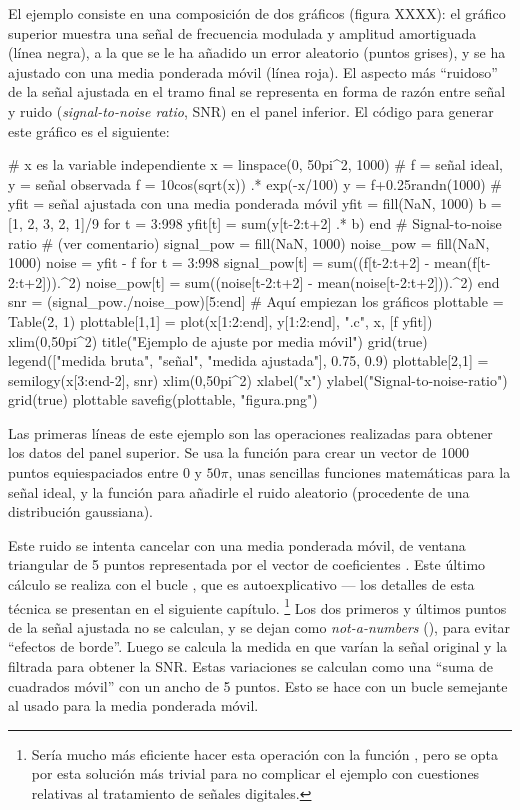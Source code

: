 El ejemplo consiste en una composición de dos gráficos (figura XXXX): el gráfico superior muestra una señal de frecuencia modulada y amplitud amortiguada (línea negra), a la que se le ha añadido un error aleatorio (puntos grises), y se ha ajustado con una media ponderada móvil (línea roja). El aspecto más ``ruidoso'' de la señal ajustada en el tramo final se representa en forma de razón entre señal y ruido (\emph{signal-to-noise ratio}, SNR) en el panel inferior. El código para generar este gráfico es el siguiente:

\begin{juliacode}
# x es la variable independiente
x = linspace(0, 50pi^2, 1000)
# f = señal ideal, y = señal observada
f = 10cos(sqrt(x)) .* exp(-x/100)
y = f+0.25randn(1000)
# yfit = señal ajustada con una media ponderada móvil
yfit = fill(NaN, 1000)
b = [1, 2, 3, 2, 1]/9
for t = 3:998
  yfit[t] = sum(y[t-2:t+2] .* b)
end
# Signal-to-noise ratio
# (ver comentario)
signal_pow = fill(NaN, 1000)
noise_pow = fill(NaN, 1000)
noise = yfit - f
for t = 3:998
  signal_pow[t] = sum((f[t-2:t+2] - mean(f[t-2:t+2])).^2)
  noise_pow[t] = sum((noise[t-2:t+2] - mean(noise[t-2:t+2])).^2)
end
snr = (signal_pow./noise_pow)[5:end]
# Aquí empiezan los gráficos
plottable = Table(2, 1)
plottable[1,1] = plot(x[1:2:end], y[1:2:end], ".c", x, [f yfit])
xlim(0,50pi^2)
title("Ejemplo de ajuste por media móvil")
grid(true)
legend(["medida bruta", "señal", "medida ajustada"], 0.75, 0.9)
plottable[2,1] = semilogy(x[3:end-2], snr)
xlim(0,50pi^2)
xlabel("x")
ylabel("Signal-to-noise-ratio")
grid(true)
plottable
savefig(plottable, "figura.png")
\end{juliacode}

Las primeras líneas de este ejemplo son las operaciones realizadas para obtener los datos del panel superior. Se usa la función  para crear un vector de 1000 puntos equiespaciados entre $0$ y $50\pi$, unas sencillas funciones matemáticas para la señal ideal, y la función  para añadirle el ruido aleatorio (procedente de una distribución gaussiana).

Este ruido se intenta cancelar con una media ponderada móvil, de ventana triangular de 5 puntos representada por el vector de coeficientes . Este último cálculo se realiza con el bucle , que es autoexplicativo --- los detalles de esta técnica se presentan en  el siguiente capítulo.%
\footnote{%
Sería mucho más eficiente hacer esta operación con la
función , pero se opta por esta solución más trivial para no
complicar el ejemplo con cuestiones relativas al tratamiento de señales digitales.%
}
Los dos primeros y últimos puntos de la señal ajustada no se calculan, y se dejan como \emph{not-a-numbers} (), para evitar ``efectos de borde''. Luego se calcula la medida en que varían la señal original y la filtrada para obtener la SNR. Estas variaciones se calculan como una ``suma de cuadrados móvil'' con un ancho de 5 puntos. Esto se hace con un bucle semejante al usado para la media ponderada móvil.

